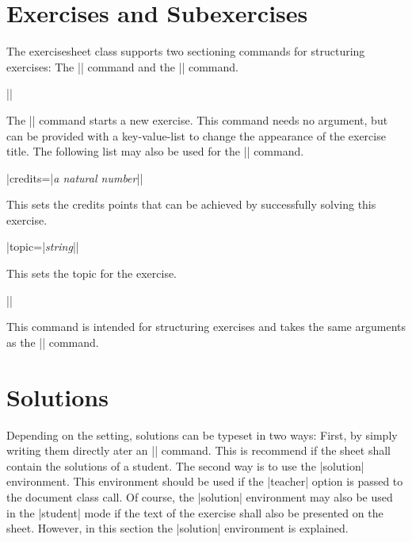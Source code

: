 \documentclass[a4paper,fleqn]{report}
\def\exercisesheet{{exercisesheet}}
\def\syntaxdefaultarg#1{\hfill\texttt{\small #1}\par\smallskip\noindent\ignorespaces}
\def\metaargument#1{\textit{\small #1}}
\begin{document}
\section{Exercises and Subexercises}

The \exercisesheet{} class supports two sectioning commands for
structuring exercises: The |\exercise| command and the |\subexercise|
command.

\begin{syntax}
  |\exercise[|\metaargument{key-value-list}|]| \syntaxdefaultarg{}
  The |\exercise| command starts a new exercise. This command needs no
  argument, but can be provided with a key-value-list to change the
  appearance of the exercise title. The following list may also be
  used for the |\subexercise| command.
  \begin{syntax}
    |credits={|\metaargument{a natural number}|}| \syntaxdefaultarg{}
    This sets the credits points that can be achieved by successfully
    solving this exercise.
  \end{syntax}
  \begin{syntax}
    |topic={|\metaargument{string}|}| \syntaxdefaultarg{}
    This sets the topic for the exercise.
  \end{syntax}
\end{syntax}

\begin{syntax}
  |\subexercise[|\metaargument{key-value-list}|]| \syntaxdefaultarg{}
  This command is intended for structuring exercises and takes the
  same arguments as the |\exercise| command.
\end{syntax}


\section{Solutions}

Depending on the setting, solutions can be typeset in two ways: First,
by simply writing them directly ater an |\exercise| command. This is
recommend if the sheet shall contain the solutions of a student. The
second way is to use the |solution| environment. This environment
should be used if the |teacher| option is passed to the document class
call. Of course, the |solution| environment may also be used in
the |student| mode if the text of the exercise shall also be presented
on the sheet. However, in this section the |solution| environment is
explained.
\end{document}
